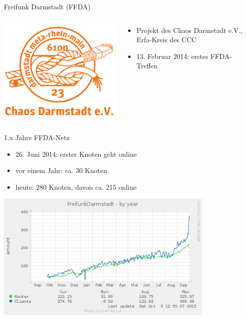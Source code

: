 \documentclass[10pt]{beamer}
\begin{document}
\begin{frame}{Freifunk Darmstadt (FFDA)}
	\begin{columns}[c]
		\begin{column}{4cm}
			\includegraphics[width=\textwidth]{images/cda}
		\end{column}
		\begin{column}{8cm}
			\begin{itemize}
				\item Projekt des Chaos Darmstadt e.V., Erfa-Kreis des CCC
				\item 13. Februar 2014: erstes FFDA-Treffen
			\end{itemize}
		\end{column}
	\end{columns}
\end{frame}
\begin{frame}{1.x Jahre FFDA-Netz}
	\vfill
	\begin{itemize}[<+->]
		\item 26. Juni 2014: erster Knoten geht online
		\item vor einem Jahr: ca. 30 Knoten
		\item heute: 280 Knoten, davon ca. 215 online
	\end{itemize}
	\pause
	\begin{center}
		\includegraphics[width=0.8\textwidth]{images/ffda-Okt14-15}
	\end{center}
\end{frame}
\end{document}

